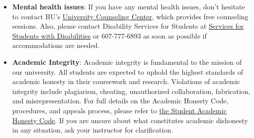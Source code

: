 \documentclass[11pt, a4paper]{article}
\begin{document}
\begin{itemize}
    \item \textbf{Mental health issues}: If you have any mental health issues, don’t hesitate to contact BU’s \href{https://www.binghamton.edu/counseling/index.html}{University Counseling Center}, which provides free counseling sessions. Also, please contact Disability Services for Students at \href{https://www.binghamton.edu/ssd/index.html}{Services for Students with Disabilities} or 607-777-6893 as soon as possible if accommodations are needed.
    \item \textbf{Academic Integrity}: Academic integrity is fundamental to the mission of our university. All students are expected to uphold the highest standards of academic honesty in their coursework and research. Violations of academic integrity include plagiarism, cheating, unauthorized collaboration, fabrication, and misrepresentation. For full details on the Academic Honesty Code, procedures, and appeals process, please refer to \href{https://www.binghamton.edu/watson/about/academic-honesty.html}{the Student Academic Honesty Code}. If you are unsure about what constitutes academic dishonesty in any situation, ask your instructor for clarification.
\end{itemize}

\end{document}
